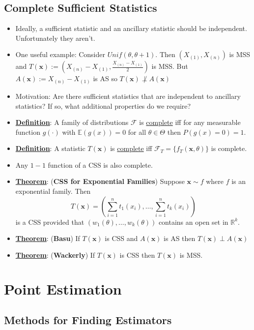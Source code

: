 \documentclass{article}
\newcommand{\R}{{\mathbb{R}}}
\newcommand{\E}{{\mathbb{E}}}
\newcommand{\x}{{\textbf{x}}}
\begin{document}
\subsection{Complete Sufficient Statistics}
\begin{itemize}
\item Ideally, a sufficient statistic and an ancillary statistic should be independent. Unfortunately they aren't.  
\item One useful example: Consider $Unif(\theta, \theta+1)$. Then $(X_{(1)},X_{(n)})$ is MSS and $T(\x) := (X_{(n)}-X_{(1)}, \frac{X_{(n)}-X_{(1)}}{2})$ is MSS. But $A(\x):=X_{(n)}-X_{(1)}$ is AS so $T(\x)\not\perp A(\x)$
\item Motivation: Are there sufficient statistics that are independent to ancillary statistics? If so, what additional properties do we require? 
\item \underline{\textbf{Definition}}: A family of distributions $\mathcal{F}$ is \underline{complete} iff for any measurable function $g(\cdot)$ with $\E(g(x)) = 0$ for all $\theta \in \Theta$ then $P(g(x) = 0) = 1$. 
\item \underline{\textbf{Definition}}: A statistic $T(\x)$ is \underline{complete} iff $\mathcal{F}_{T} = \{f_{T}(\x,\theta)\}$ is complete. 
\item Any $1-1$ function of a CSS is also complete. 
\item \underline{\textbf{Theorem}}: (\textbf{CSS for Exponential Families}) Suppose $\x\sim f$ where $f$ is an exponential family. Then $$T(\x) = \left(\sum_{i=1}^{n}t_1(x_i),\ldots,\sum_{i=1}^{n}t_k(x_i)\right)$$ is a CSS provided that $(w_1(\theta),\ldots, w_k(\theta))$ contains an open set in $\R^k$. 
\item \underline{\textbf{Theorem}}: (\textbf{Basu}) If $T(\x)$ is CSS and $A(\x)$ is AS then $T(\x)\perp A(\x)$
\item \underline{\textbf{Theorem}}: (\textbf{Wackerly}) If $T(\x)$ is CSS then $T(\x)$ is MSS.  
\end{itemize}

\section{Point Estimation}%

\subsection{Methods for Finding Estimators}
\end{document}
